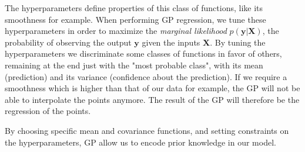\noindent The hyperparameters define properties of this class of functions, like its smoothness for example.
When performing GP regression, we tune these hyperparameters in order to maximize the \emph{marginal likelihood} $p(\bm{y}\vert \bm{X})$, the probability of observing the output $\bm{y}$ given the inputs $\bm{X}$.
By tuning the hyperparameters we  discriminate some classes of functions in favor of others, remaining at the end just with the "most probable class", with its mean (prediction) and its variance (confidence about the prediction).
If we require a smoothness which is higher than that of our data for example, the GP will not be able to interpolate the points anymore.
The result of the GP will therefore be the regression of the points.

By choosing specific mean and covariance functions, and setting constraints on the hyperparameters, GP allow us to encode prior knowledge in our model.


  













